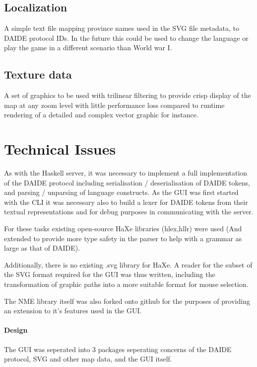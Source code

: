\subsection{Localization}

A simple text file mapping province names used in the SVG file
metadata, to DAIDE protocol IDs. In the future this could be used to
change the language or play the game in a different scenario than
World war I.

\subsection{Texture data}

A set of graphics to be used with trilinear filtering to provide
crisp display of the map at any zoom level with little
performance loss compared to runtime rendering of a detailed and
complex vector graphic for instance.

\section{Technical Issues}
As with the Haskell server, it was necessary to implement a full
implementation of the DAIDE protocol including
serialisation / deserialisation of DAIDE tokens, and parsing / unparsing
of language constructs. As the GUI was first started with the CLI it
was necessary also to build a lexer for DAIDE tokens from their
textual representations and for debug purposes in communicating with
the server.

For these tasks existing open-source HaXe libraries (hlex,hllr) were
used (And extended to provide more type safety in the parser to help
with a grammar as large as that of DAIDE).

Additionally, there is no existing .svg library for HaXe. A reader for
the subset of the SVG format required for the GUI was thus written,
including the transformation of graphic paths into a more suitable
format for mouse selection.

The NME library itself was also forked onto github for the purposes of
providing an extension to it's features used in the GUI.

\paragraph{Design}
The GUI was seperated into 3 packages seperating concerns of the DAIDE
protocol, SVG and other map data, and the GUI itself.\\[0.5cm]

